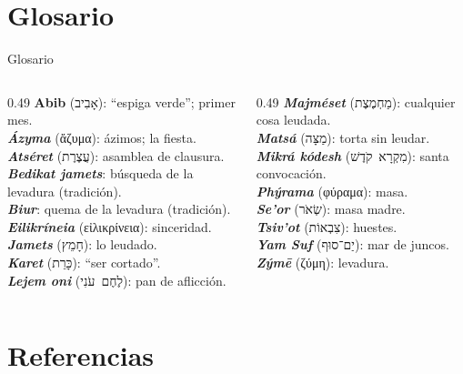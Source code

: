 \documentclass[hyperref={bookmarks=false},aspectratio=169]{beamer}
\newcommand{\heb}[1]{\mbox{\foreignlanguage{hebrew}{#1}}}
\newcommand{\grc}[1]{\foreignlanguage{ancientgreek}{#1}}
\begin{document}
\section{Glosario}

\begin{frame}{Glosario}
\scriptsize
\begin{columns}[t,onlytextwidth]
\begin{column}{0.49\textwidth}
\textbf{Abib} (\heb{אָבִיב}): ``espiga verde''; primer mes.\\
\textbf{\emph{Ázyma}} (\grc{ἄζυμα}): ázimos; la fiesta.\\
\textbf{\emph{Atséret}} (\heb{עֲצֶרֶת}): asamblea de clausura.\\
\textbf{\emph{Bedikat jamets}}: búsqueda de la levadura (tradición).\\
\textbf{\emph{Biur}}: quema de la levadura (tradición).\\
\textbf{\emph{Eilikríneia}} (\grc{εἰλικρίνεια}): sinceridad.\\
\textbf{\emph{Jamets}} (\heb{חָמֵץ}): lo leudado.\\
\textbf{\emph{Karet}} (\heb{כָּרֵת}): ``ser cortado''.\\
\textbf{\emph{Lejem oni}} (\heb{לֶחֶם עֹנִי}): pan de aflicción.
\end{column}
\begin{column}{0.49\textwidth}
\textbf{\emph{Majméset}} (\heb{מַחְמֶצֶת}): cualquier cosa leudada.\\
\textbf{\emph{Matsá}} (\heb{מַצָּה}): torta sin leudar.\\
\textbf{\emph{Mikrá kódesh}} (\heb{מִקְרָא קֹדֶשׁ}): santa convocación.\\
\textbf{\emph{Phýrama}} (\grc{φύραμα}): masa.\\
\textbf{\emph{Se'or}} (\heb{שְׂאֹר}): masa madre.\\
\textbf{\emph{Tsiv'ot}} (\heb{צִבְאוֹת}): huestes.\\
\textbf{\emph{Yam Suf}} (\heb{יַם־סוּף}): mar de juncos.\\
\textbf{\emph{Zýmē}} (\grc{ζύμη}): levadura.
\end{column}
\end{columns}
\end{frame}

\section{Referencias}
\end{document}

